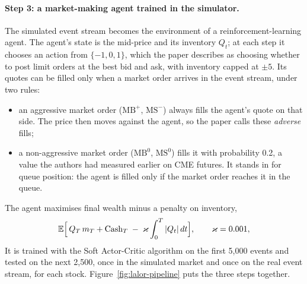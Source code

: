 \paragraph{Step 3: a market-making agent trained in the simulator.} The simulated event stream becomes the environment of a
reinforcement-learning agent. The agent's state is the mid-price and its inventory $Q_t$; at each step it
chooses an action from $\{-1,0,1\}$, which the paper describes as choosing whether to post limit orders at the
best bid and ask, with inventory capped at $\pm 5$. Its quotes can be filled only when a market order arrives
in the event stream, under two rules:
\begin{itemize}[leftmargin=1.5em,itemsep=1pt]
\item an aggressive market order ($\text{MB}^{+}$, $\text{MS}^{-}$) always fills the agent's quote on that side.
  The price then moves against the agent, so the paper calls these \emph{adverse} fills;
\item a non-aggressive market order ($\text{MB}^{0}$, $\text{MS}^{0}$) fills it with probability 0.2, a value
  the authors had measured earlier on CME futures. It stands in for queue position: the agent is filled only
  if the market order reaches it in the queue.
\end{itemize}
The agent maximises final wealth minus a penalty on inventory,
\begin{equation}
\mathbb{E}\Bigl[\,Q_T\, m_T + \text{Cash}_T \;-\; \varkappa \int_0^T |Q_t|\,dt\Bigr],
\qquad \varkappa = 0.001,
\label{eq:lalor-reward}
\end{equation}
It is trained with the Soft Actor-Critic algorithm on the first 5{,}000 events and tested on the next 2{,}500,
once in the simulated market and once on the real event stream, for each stock.
Figure~\ref{fig:lalor-pipeline} puts the three steps together.

